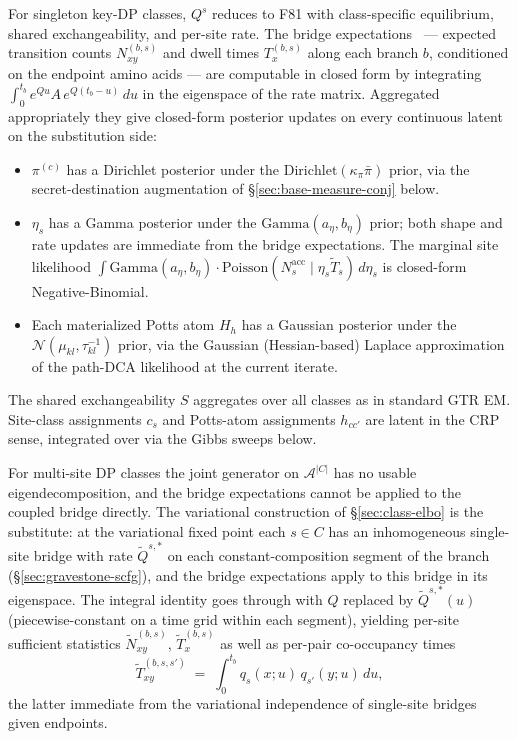 For singleton key-DP classes, $Q^s$ reduces to F81 with
class-specific equilibrium, shared exchangeability, and per-site
rate. The bridge expectations~\citep{HolmesRubin2002} --- expected transition counts $N^{(b,s)}_{xy}$ and
dwell times $T^{(b,s)}_x$ along each branch $b$, conditioned on the
endpoint amino acids --- are computable in closed form by
integrating $\int_0^{t_b} e^{Q u} A\, e^{Q(t_b - u)}\,du$ in the
eigenspace of the rate matrix. Aggregated appropriately they give
closed-form posterior updates on every continuous latent on the
substitution side:
\begin{itemize}
    \item $\pi^{(c)}$ has a Dirichlet posterior under the
      $\mathrm{Dirichlet}(\kappa_\pi \bar\pi)$ prior, via the
      secret-destination augmentation of
      \S\ref{sec:base-measure-conj} below.
    \item $\eta_s$ has a Gamma posterior under the
      $\mathrm{Gamma}(a_\eta, b_\eta)$ prior; both shape and rate
      updates are immediate from the bridge expectations.
      The marginal site likelihood
      $\int \mathrm{Gamma}(a_\eta, b_\eta) \cdot \mathrm{Poisson}(N_s^{\mathrm{acc}} \mid \eta_s \tilde T_s)\, d\eta_s$
      is closed-form Negative-Binomial.
    \item Each materialized Potts atom $H_h$ has a Gaussian
      posterior under the $\mathcal{N}(\mu_{kl}, \tau_{kl}^{-1})$
      prior, via the Gaussian (Hessian-based) Laplace approximation
      of the path-DCA likelihood at the current iterate.
\end{itemize}
The shared exchangeability $S$ aggregates over all classes as in
standard GTR EM. Site-class assignments $c_s$ and Potts-atom
assignments $h_{cc'}$ are latent in the CRP sense, integrated over
via the Gibbs sweeps below.

For multi-site DP classes the joint generator on
$\mathcal{A}^{|C|}$ has no usable eigendecomposition, and
the bridge expectations cannot be applied to the coupled bridge directly. The
variational construction of \S\ref{sec:class-elbo} is the
substitute: at the variational fixed point each $s \in C$ has an
inhomogeneous single-site bridge with rate $\tilde Q^{s,*}$ on each
constant-composition segment of the branch
(\S\ref{sec:gravestone-scfg}), and the bridge expectations apply to this
bridge in its eigenspace. The integral identity goes through with
$Q$ replaced by $\tilde Q^{s,*}(u)$ (piecewise-constant on a time
grid within each segment), yielding per-site sufficient statistics
$\tilde N^{(b,s)}_{xy}$, $\tilde T^{(b,s)}_x$ as well as per-pair
co-occupancy times
\[
\tilde T^{(b, s, s')}_{xy} \;=\; \int_0^{t_b} q_s(x; u)\, q_{s'}(y; u)\, du,
\]
the latter immediate from the variational independence of single-site
bridges given endpoints.

